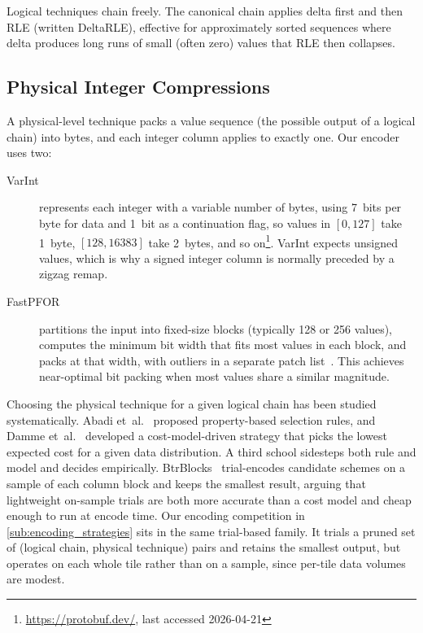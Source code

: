 Logical techniques chain freely.
The canonical chain applies delta first and then \ac{RLE} (written DeltaRLE), effective for approximately sorted sequences where delta produces long runs of small (often zero) values that \ac{RLE} then collapses.

\subsection{Physical Integer Compressions}\label{sub:physical_integer_compressions}

A physical-level technique packs a value sequence (the possible output of a logical chain) into bytes, and each integer column applies to exactly one.
Our encoder uses two:

\begin{description}
    \item[\acf{VarInt}] represents each integer with a variable number of bytes, using 7~bits per byte for data and 1~bit as a continuation flag, so values in $[0, 127]$ take 1~byte, $[128, 16383]$ take 2~bytes, and so on\footnote{\url{https://protobuf.dev/}, last accessed 2026-04-21}.
    VarInt expects unsigned values, which is why a signed integer column is normally preceded by a zigzag remap.

    \item[\acf{FastPFOR}] partitions the input into fixed-size blocks (typically 128 or 256 values), computes the minimum bit width that fits most values in each block, and packs at that width, with outliers in a separate patch list~\cite{lemireDecodingBillionsIntegers2015}.
    This achieves near-optimal bit packing when most values share a similar magnitude.
\end{description}

Choosing the physical technique for a given logical chain has been studied systematically.
Abadi et~al.~\cite{abadiIntegratingCompressionExecution2006} proposed property-based selection rules, and Damme et~al.~\cite{dammeComprehensiveExperimentalSurvey2019} developed a cost-model-driven strategy that picks the lowest expected cost for a given data distribution.
A third school sidesteps both rule and model and decides empirically.
BtrBlocks~\cite{kuschewskiBtrBlocksEfficientColumnar2023} trial-encodes candidate schemes on a sample of each column block and keeps the smallest result, arguing that lightweight on-sample trials are both more accurate than a cost model and cheap enough to run at encode time.
Our encoding competition in \cref{sub:encoding_strategies} sits in the same trial-based family.
It trials a pruned set of (logical chain, physical technique) pairs and retains the smallest output, but operates on each whole tile rather than on a sample, since per-tile data volumes are modest.

